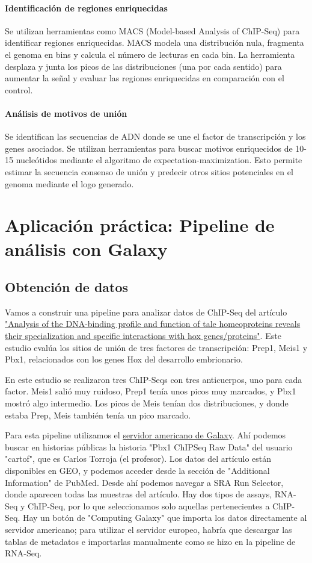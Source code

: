 \paragraph{Identificación de regiones enriquecidas}
Se utilizan herramientas como MACS (Model-based Analysis of ChIP-Seq) para identificar regiones enriquecidas.
MACS modela una distribución nula, fragmenta el genoma en bins y calcula el número de lecturas en cada bin.
La herramienta desplaza y junta los picos de las distribuciones (una por cada sentido) para aumentar la señal y evaluar las regiones enriquecidas en comparación con el control.

\paragraph{Análisis de motivos de unión}
Se identifican las secuencias de ADN donde se une el factor de transcripción y los genes asociados.
Se utilizan herramientas para buscar motivos enriquecidos de 10-15 nucleótidos mediante el algoritmo de expectation-maximization.
Esto permite estimar la secuencia consenso de unión y predecir otros sitios potenciales en el genoma mediante el logo generado.

\section{Aplicación práctica: Pipeline de análisis con Galaxy}
\subsection{Obtención de datos}
Vamos a construir una pipeline para analizar datos de ChIP-Seq del artículo \href{https://www.sciencedirect.com/science/article/pii/S2211124713001368?via\%3Dihub}{"Analysis of the DNA-binding profile and function of tale homeoproteins reveals their specialization and specific interactions with hox genes/proteins"}. Este estudio evalúa los sitios de unión de tres factores de transcripción: Prep1, Meis1 y Pbx1, relacionados con los genes Hox del desarrollo embrionario.

En este estudio se realizaron tres ChIP-Seqs con tres anticuerpos, uno para cada factor. Meis1 salió muy ruidoso, Prep1 tenía unos picos muy marcados, y Pbx1 mostró algo intermedio. Los picos de Meis tenían dos distribuciones, y donde estaba Prep, Meis también tenía un pico marcado. 

Para esta pipeline utilizamos el \href{https://usegalaxy.org/}{servidor americano de Galaxy}. Ahí podemos buscar en historias públicas la historia "Pbx1 ChIPSeq Raw Data" del usuario "cartof", que es Carlos Torroja (el profesor). Los datos del artículo están disponibles en GEO, y podemos acceder desde la sección de "Additional Information" de PubMed. Desde ahí podemos navegar a SRA Run Selector, donde aparecen todas las muestras del artículo. Hay dos tipos de assays, RNA-Seq y ChIP-Seq, por lo que seleccionamos solo aquellas pertenecientes a ChIP-Seq. Hay un botón de "Computing Galaxy" que importa los datos directamente al servidor americano; para utilizar el servidor europeo, habría que descargar las tablas de metadatos e importarlas manualmente como se hizo en la pipeline de RNA-Seq.

